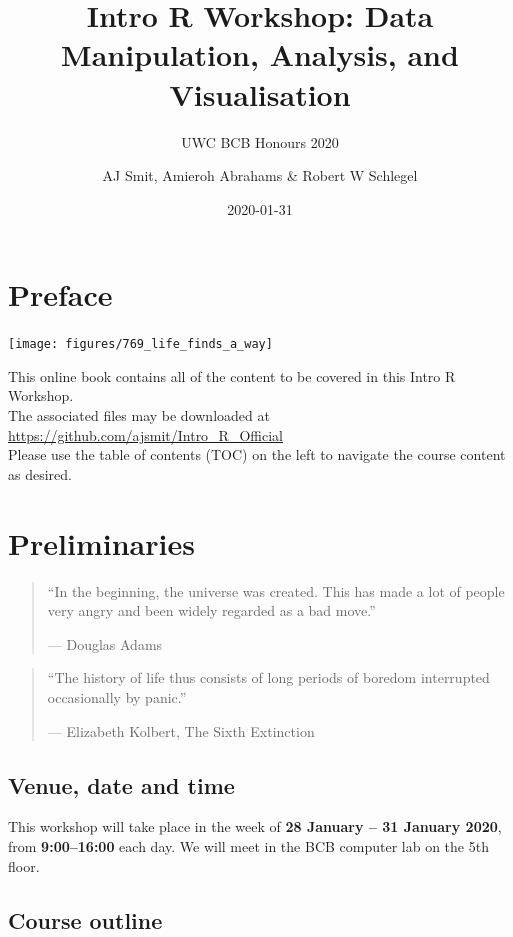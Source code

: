 \documentclass[
]{book}
\title{Intro R Workshop: Data Manipulation, Analysis, and Visualisation}
\subtitle{UWC BCB Honours 2020}
\author{AJ Smit, Amieroh Abrahams \& Robert W Schlegel}
\date{2020-01-31}
\begin{document}
\maketitle

{
\setcounter{tocdepth}{1}
\tableofcontents
}
\hypertarget{preface}{%
\chapter*{Preface}\label{preface}}

\begin{center}\texttt{[image: figures/769\_life\_finds\_a\_way]} \end{center}

This online book contains all of the content to be covered in this Intro R Workshop.\\
The associated files may be downloaded at \url{https://github.com/ajsmit/Intro_R_Official}\\
Please use the table of contents (TOC) on the left to navigate the course content as desired.

\hypertarget{prelim}{%
\chapter{Preliminaries}\label{prelim}}

\begin{quote}
``In the beginning, the universe was created. This has made a lot of people very angry and been widely regarded as a bad move.''

--- Douglas Adams
\end{quote}

\begin{quote}
``The history of life thus consists of long periods of boredom interrupted occasionally by panic.''

--- Elizabeth Kolbert, The Sixth Extinction
\end{quote}

\hypertarget{venue-date-and-time}{%
\section{Venue, date and time}\label{venue-date-and-time}}

This workshop will take place in the week of \textbf{28 January -- 31 January 2020}, from \textbf{9:00--16:00} each day. We will meet in the BCB computer lab on the 5th floor.

\hypertarget{course-outline}{%
\section{Course outline}\label{course-outline}}
\end{document}
